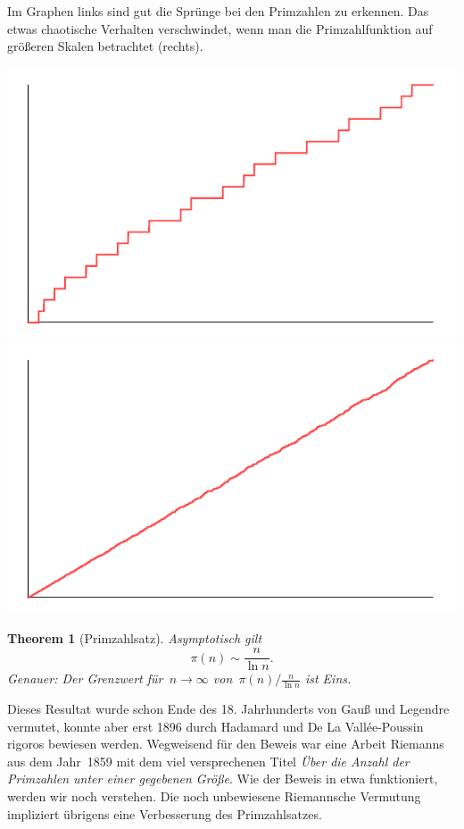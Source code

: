 \documentclass[twoside]{../zirkelblatt1415}
\theoremstyle{definition}
\theoremstyle{plain}
\newtheorem{thm}[defn]{Theorem}
\theoremstyle{remark}
\begin{document}
Im Graphen links sind gut die Sprünge bei den Primzahlen zu erkennen. Das etwas
chaotische Verhalten verschwindet, wenn man die Primzahlfunktion auf größeren
Skalen betrachtet (rechts).

\begin{center}
  \includegraphics[scale=0.5]{pi-function-1}\qquad\qquad
  \includegraphics[scale=0.5]{pi-function-2}
\end{center}

\begin{thm}[Primzahlsatz]\label{thm:primzahlsatz}
Asymptotisch gilt
\[ \pi(n) \sim \frac{n}{\ln n}. \]
Genauer: Der Grenzwert für~$n \to \infty$ von~$\pi(n) / \frac{n}{\ln n}$ ist
Eins.
\end{thm}

Dieses Resultat wurde schon Ende des 18. Jahrhunderts von Gauß und Legendre
vermutet, konnte aber erst 1896 durch Hadamard und De La Vallée-Poussin rigoros
bewiesen werden. Wegweisend für den Beweis war eine Arbeit Riemanns aus dem
Jahr~1859 mit dem viel versprechenen Titel \emph{Über die Anzahl der Primzahlen
unter einer gegebenen Größe}. Wie der Beweis in etwa funktioniert, werden wir
noch verstehen. Die noch unbewiesene Riemannsche Vermutung impliziert übrigens
eine Verbesserung des Primzahlsatzes.
\end{document}
